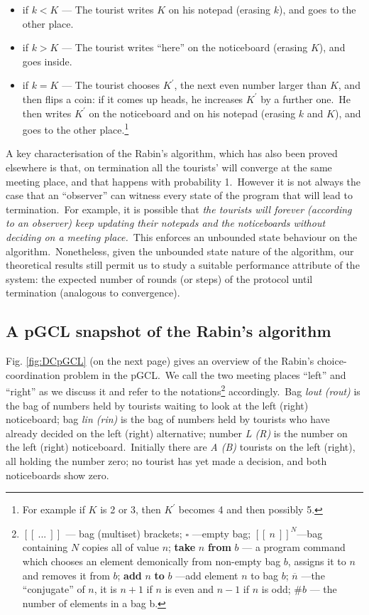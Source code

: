 \documentclass[numbers,copyright,creativecommons]{eptcs}
\newcommand{\bag}[2]{{[[\ #1\ ]]}^{#2}}
\begin{document}
\begin{itemize}
\item []if $k < K$ --- The tourist writes $K$ on his notepad (erasing $k$), and goes to the
        other place.
\item [] if $k > K$ --- The tourist writes ``here'' on the noticeboard (erasing $K$), and
        goes inside.
\item [] if $k = K$ --- The tourist chooses $K^{'}$, the next even number larger than $K$,
        and then flips a coin: if it comes up heads, he increases $K^{'}$ by a further one.\
        He then writes $K^{'}$ on the noticeboard and on his notepad (erasing $k$ and $K$),
        and goes to the other place.\footnote{For example if $K$ is 2 or 3, then $K^{'}$ becomes
        4 and then possibly 5.}
\end{itemize}
A key characterisation of the Rabin's algorithm, which has also been proved elsewhere \cite{ARP} is that, on termination all the tourists' will converge at the same meeting place, and that happens with probability 1.\ However it is not always the case that an ``observer'' can witness every state of the program that will
lead to termination.\ For example, it is possible that {\it the tourists will forever (according to
an observer) keep updating their notepads and the noticeboards without deciding on a meeting
place.}\ This enforces an {unbounded state} behaviour on the algorithm.\ Nonetheless, given the unbounded state nature of the algorithm,
our theoretical results still permit us to study a suitable performance attribute of the system: the expected number of rounds (or steps) of the protocol until termination (analogous to convergence).






\subsection{A pGCL snapshot of the Rabin's algorithm}
Fig. {\ref{fig:DCpGCL}} (on the next page) gives an overview of the Rabin's choice-coordination
problem in the pGCL.\ We call the two meeting places ``left'' and ``right'' as we discuss it and refer to the
notations\footnote{$\bag{...}{}$ --- bag (multiset) brackets; $\square$ ---empty bag; $\bag{n}{N}$---bag containing $N$ copies all of value $n$; {\bf take} $n$ {\bf from} $b$ --- a program command which chooses an element demonically from non-empty bag $b$, assigns it to $n$ and removes it from $b$; {\bf add} $n$ {\bf to} $b$ ---add element $n$ to bag $b$; $\overline{n}$ ---the ``conjugate'' of $n$, it is $n + 1$ if $n$ is even and $n - 1$ if $n$ is odd; $\#b$ --- the number of elements in a bag b.} accordingly.\
Bag {\it lout (rout)} is the bag of numbers held by tourists waiting to look at the left (right) noticeboard;
bag {\it lin (rin)} is the bag of numbers held by tourists who have already decided on the left (right)
alternative; number {\it L (R)} is the number on the left (right) noticeboard.\ Initially there are {\it A (B)} tourists
on the left (right), all holding the number zero; no tourist has yet made a decision, and both noticeboards
show zero.
\end{document}
